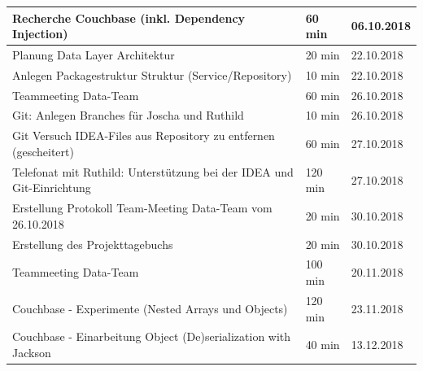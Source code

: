 \begin{longtable}{|p{10cm}|p{2cm}|p{2cm}|}
		Recherche Couchbase (inkl. Dependency Injection)                                         & 60 min                                & 06.10.2018                            \\ \hline
		Planung Data Layer Architektur                                                           & 20 min                                & 22.10.2018                            \\ \hline
		Anlegen Packagestruktur Struktur (Service/Repository)                                    & 10 min                                & 22.10.2018                            \\ \hline
		Teammeeting Data-Team                                                                    & 60 min                                & 26.10.2018                            \\ \hline
		Git: Anlegen Branches für Joscha und Ruthild                                             & 10 min                                & 26.10.2018                            \\ \hline
		Git Versuch IDEA-Files aus Repository zu entfernen (gescheitert)                         & 60 min                                & 27.10.2018                            \\ \hline
		Telefonat mit Ruthild: Unterstützung bei der IDEA und Git-Einrichtung                    & 120 min                               & 27.10.2018                            \\ \hline
		Erstellung Protokoll Team-Meeting Data-Team vom 26.10.2018                               & 20 min                                & 30.10.2018                            \\ \hline
		Erstellung des Projekttagebuchs                                                          & 20 min                                & 30.10.2018                            \\ \hline
		Teammeeting Data-Team                                                                    & 100 min                               & 20.11.2018                            \\ \hline
		Couchbase - Experimente (Nested Arrays und Objects)                                      & 120 min                               & 23.11.2018                            \\ \hline
		Couchbase - Einarbeitung Object (De)serialization with Jackson                           & 40 min                                & 13.12.2018                            \\ \hline

\end{longtable}
